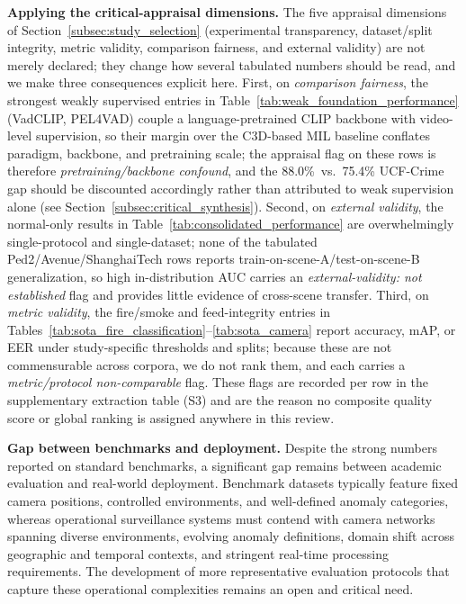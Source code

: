 \documentclass[10pt,a4paper]{article}
\begin{document}
\textbf{Applying the critical-appraisal dimensions.} The five appraisal dimensions of Section~\ref{subsec:study_selection} (experimental transparency, dataset/split integrity, metric validity, comparison fairness, and external validity) are not merely declared; they change how several tabulated numbers should be read, and we make three consequences explicit here. First, on \emph{comparison fairness}, the strongest weakly supervised entries in Table~\ref{tab:weak_foundation_performance} (VadCLIP, PEL4VAD) couple a language-pretrained CLIP backbone with video-level supervision, so their margin over the C3D-based MIL baseline conflates paradigm, backbone, and pretraining scale; the appraisal flag on these rows is therefore \emph{pretraining/backbone confound}, and the 88.0\%~vs.~75.4\% UCF-Crime gap should be discounted accordingly rather than attributed to weak supervision alone (see Section~\ref{subsec:critical_synthesis}). Second, on \emph{external validity}, the normal-only results in Table~\ref{tab:consolidated_performance} are overwhelmingly single-protocol and single-dataset; none of the tabulated Ped2/Avenue/ShanghaiTech rows reports train-on-scene-A/test-on-scene-B generalization, so high in-distribution AUC carries an \emph{external-validity: not established} flag and provides little evidence of cross-scene transfer. Third, on \emph{metric validity}, the fire/smoke and feed-integrity entries in Tables~\ref{tab:sota_fire_classification}--\ref{tab:sota_camera} report accuracy, mAP, or EER under study-specific thresholds and splits; because these are not commensurable across corpora, we do not rank them, and each carries a \emph{metric/protocol non-comparable} flag. These flags are recorded per row in the supplementary extraction table (S3) and are the reason no composite quality score or global ranking is assigned anywhere in this review.

\textbf{Gap between benchmarks and deployment.} Despite the strong numbers reported on standard benchmarks, a significant gap remains between academic evaluation and real-world deployment. Benchmark datasets typically feature fixed camera positions, controlled environments, and well-defined anomaly categories, whereas operational surveillance systems must contend with camera networks spanning diverse environments, evolving anomaly definitions, domain shift across geographic and temporal contexts, and stringent real-time processing requirements. The development of more representative evaluation protocols that capture these operational complexities remains an open and critical need.
\end{document}
